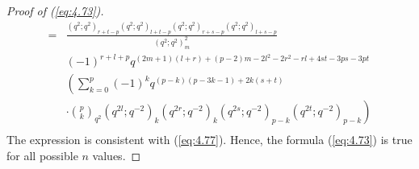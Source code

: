 \documentclass[10pt,a4paper]{amsart}
\begin{document}
\begin{proof}[Proof of (\ref{eq:4.73})]
\begin{equation}
\begin{split}
            =&\frac{(q^2;q^2)_{r+t-p}(q^2;q^2)_{l+t-p}(q^2;q^2)_{r+s-p}(q^2;q^2)_{l+s-p}}{(q^2;q^2)_m^2}\\
            &(-1)^{r+l+p}q^{(2m+1)(l+r)+(p-2)m-2l^2-2r^2-rl+4st-3ps-3pt}\\
            &\left(\sum_{k=0}^{p}(-1)^{k}q^{(p-k)(p-3k-1)+2k(s+t)}\right.\\
            &\left.\cdot{p\choose k}_{q^{2}}(q^{2l};q^{-2})_k(q^{2r};q^{-2})_k(q^{2s};q^{-2})_{p-k}(q^{2t};q^{-2})_{p-k}\right)\\
        \end{split}
    \end{equation}
    The expression is consistent with (\ref{eq:4.77}). Hence, the formula (\ref{eq:4.73}) is true for all possible $n$ values.
\end{proof}
\end{document}
